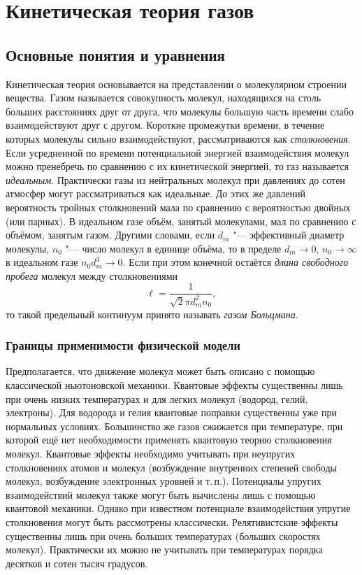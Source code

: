 \chapter{Кинетическая теория газов} \label{chapt:theory}

\section{Основные понятия и уравнения} \label{sect:fundamentals}

Кинетическая теория основывается на представлении о молекулярном строении вещества.
Газом называется совокупность молекул, находящихся на столь больших расстояниях друг от друга,
что молекулы большую часть времени слабо взаимодействуют друг с другом.
Короткие промежутки времени, в течение которых молекулы сильно взаимодействуют, рассматриваются как \emph{столкновения}.
Если усредненной по времени потенциальной энергией взаимодействия молекул можно пренебречь
по сравнению с их кинетической энергией, то газ называется \emph{идеальным}.
Практически газы из нейтральных молекул при давлениях до сотен атмосфер могут рассматриваться как идеальные.
До этих же давлений вероятность тройных столкновений мала по сравнению с вероятностью двойных (или парных).
В идеальном газе объём, занятый молекулами, мал по сравнению с объёмом, занятым газом.
Другими словами, если \(d_m\) "--- эффективный диаметр молекулы,
\(n_0\) "--- число молекул в единице объёма, то в пределе \(d_m\to0\), \(n_0\to\infty\)
в идеальном газе \(n_0 d_m^3\to0\).
Если при этом конечной остаётся \emph{длина свободного пробега} молекул между столкновениями
\begin{equation}\label{eq:ell}
    \ell = \frac1{\sqrt2\pi d_m^2 n_0},
\end{equation}
то такой предельный континуум принято называть \emph{газом Больцмана}.

\subsection{Границы применимости физической модели}

Предполагается, что движение молекул может быть описано с помощью классической ньютоновской механики.
Квантовые эффекты существенны лишь при очень низких температурах и для легких молекул (водород, гелий, электроны).
Для водорода и гелия квантовые поправки существенны уже при нормальных условиях.
Большинство же газов сжижается при температуре,
при которой ещё нет необходимости применять квантовую теорию столкновения молекул.
Квантовые эффекты необходимо учитывать при неупругих столкновениях атомов и молекул
(возбуждение внутренних степеней свободы молекул, возбуждение электронных уровней и т.\,п.).
Потенциалы упругих взаимодействий молекул также могут быть вычислены лишь с помощью квантовой механики.
Однако при известном потенциале взаимодействия упругие столкновения могут быть рассмотрены классически.
Релятивистские эффекты существенны лишь при очень больших температурах (больших скоростях молекул).
Практически их можно не учитывать при температурах порядка десятков и сотен тысяч градусов.

